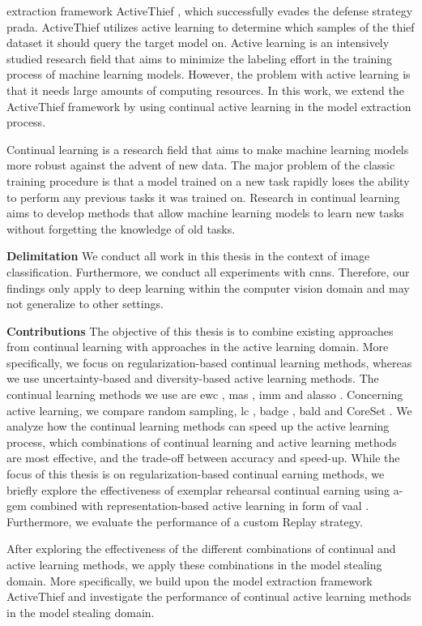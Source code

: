 extraction framework ActiveThief \cite{pal2020activethief}, which successfully evades the defense strategy  \gls{prada}. ActiveThief utilizes active
learning to determine which samples of the thief dataset it should query the target model on. Active learning is an intensively studied research
field that aims to minimize the labeling effort in the training process of machine learning models. However, the problem with active learning is
that it needs large amounts of computing resources. In this work, we extend the ActiveThief framework by using continual active learning in the model
extraction process.\par
Continual learning is a research field that aims to make machine learning models more robust against the advent of new data. The major problem
of the classic training procedure is that a model trained on a new task rapidly loses the ability to perform any previous tasks it was trained on.
Research in continual learning aims to develop methods that allow machine learning models to learn new tasks without forgetting the knowledge of old 
tasks. \par
\textbf{Delimitation} \hspace{0.2cm} We conduct all work in this thesis in the context of image classification. Furthermore, we conduct all experiments
with \glspl{cnn}. Therefore, our findings only apply to deep learning within the computer vision domain and may not generalize to other settings. \par
\textbf{Contributions} \hspace{0.2cm} The objective of this thesis is to combine existing approaches from continual learning
with approaches in the active learning domain. More specifically, we focus on regularization-based continual learning methods,
whereas we use uncertainty-based and diversity-based active learning methods. The continual learning methods we use are \gls{ewc} \cite{kirkpatrick2017overcoming},
\gls{mas} \cite{aljundi2018memory}, \gls{imm} \cite{lee2017overcoming} and \gls{alasso} \cite{park2019continual}.
Concerning active learning, we compare random sampling, \gls{lc} \cite{lewis1995sequential}, \gls{badge} \cite{ash2019deep}, \gls{bald} \cite{houlsby2011bayesian} and
CoreSet \cite{sener2017active}.
We analyze how the continual learning methods can speed up the active learning process, which combinations of continual learning and active learning methods
are most effective, and the trade-off between accuracy and speed-up. While the focus of this thesis is on regularization-based continual
earning methods, we briefly explore the effectiveness of exemplar rehearsal continual earning using \gls{a-gem} \cite{chaudhry2018efficient}
combined with representation-based active learning in form of \gls{vaal} \cite{sinha2019variational}. Furthermore, we evaluate the performance of a custom Replay strategy.\par
After exploring the effectiveness of the different combinations of continual and active learning methods, we apply these combinations in the model stealing
domain. More specifically, we build upon the model extraction framework ActiveThief \cite{pal2020activethief} and investigate the performance of continual
active learning methods in the model stealing domain.